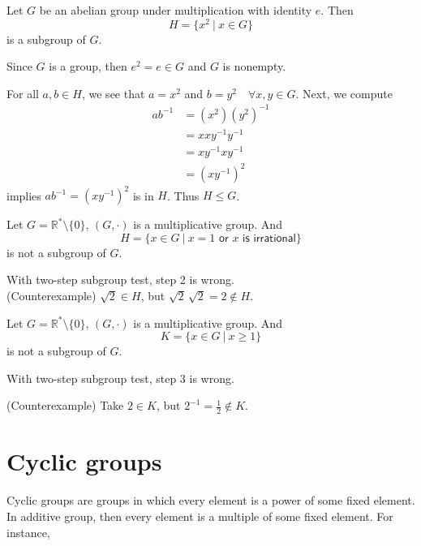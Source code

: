 \begin{example}
    Let $G$ be an abelian group under multiplication with identity $e$. Then 
    \[
        H = \{ x^2  \> | \> x \in G \}
    \]
    is a subgroup of $G$.
\end{example}
\begin{solution}
    \item Since $G$ is a group, then $e^2 = e \in G$ and $G$ is nonempty.
    \item For all $a, b \in H$, we see that $a = x^2$ and $b = y^2 \quad \forall x,y \in G$. Next, we compute
    \begin{align*}
        ab^{-1} &= (x^2)(y^2)^{-1}\\
        &= xxy^{-1}y^{-1}\\
        &= xy^{-1}xy^{-1}\\
        &= (xy^{-1})^2
    \end{align*}
    implies $ab^{-1} = (xy^{-1})^2$ is in $H$. Thus $H \leq G$.
\end{solution}

\begin{example}
    Let $G = \mathbb{R}^* \setminus \{0\}$, $(G, \cdot)$ is a multiplicative group. And 
    \[
        H = \{ x \in G \> | \> x = 1 \textsf{ or } x \textsf{ is irrational} \}
    \]
    is not a subgroup of $G$.
\end{example}
\begin{solution}
    With two-step subgroup test, step 2 is wrong.\\
    (Counterexample) $\sqrt{2} \in H$, but $\sqrt{2} \, \sqrt{2} = 2 \notin H$.
\end{solution}

\begin{example}
    Let $G = \mathbb{R}^* \setminus \{0\}$, $(G, \cdot)$ is a multiplicative group. And 
    \[
        K = \{ x \in G \> | \> x \geq 1 \}
    \]
    is not a subgroup of $G$.
\end{example}
\begin{solution}
    With two-step subgroup test, step 3 is wrong.

    (Counterexample) Take $2 \in K$, but $\displaystyle 2^{-1} = \frac{1}{2} \notin K$.
\end{solution}

\section{Cyclic groups}

Cyclic groups are groups in which every element is a power of some fixed element. In additive group, then every 
element is a multiple of some fixed element. For instance,

